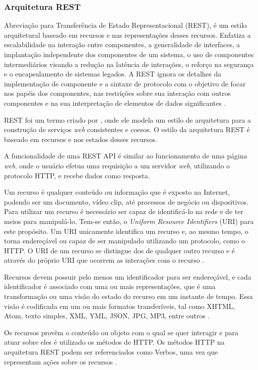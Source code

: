 \subsubsection{Arquitetura REST}
Abreviação para Transferência de Estado Representacional (REST), é um estilo arquitetural baseado em recursos e nas representações desses recursos. Enfatiza a escalabilidade na interação entre componentes, a generalidade de interfaces, a implantação independente dos componentes de um sistema, o uso de componentes intermediários visando a redução na latência de interações, o reforço na segurança e o encapsulamento de sistemas legados. A REST ignora os detalhes da implementação de componente e a sintaxe de protocolo com o objetivo de focar nos papéis dos componentes, nas restrições sobre sua interação com outros componentes e na sua interpretação de elementos de dados significantes \cite{rest}.

REST foi um termo criado por , onde ele modela um estilo de arquitetura para a construção de serviços \textit{web} consistentes e coesos. O estilo da arquitetura REST é baseado em recursos e nos estados desses recursos.

A funcionalidade de uma REST API é similar ao funcionamento de uma página \textit{web}, onde o usuário efetua uma requisição a um servidor \textit{web}, utilizando o protocolo HTTP, e recebe dados como resposta.

Um recurso é qualquer conteúdo ou informação que é exposto na Internet, podendo ser um documento, vídeo clip, até processos de negócio ou dispositivos. Para utilizar um recurso é necessário ser capaz de identificá-lo na rede e de ter meios para manipulá-lo. Tem-se então, o \textit{Uniform Resource Identifiers} (URI) para este propósito. Um URI unicamente identifica um recurso e, ao mesmo tempo, o torna endereçável ou capaz de ser manipulado utilizando um protocolo, como o HTTP. O URI de um recurso se distingue dos de qualquer outro recurso e é através do próprio URI que ocorrem as interações com o recurso \cite{rest-book}.

Recursos devem possuir pelo menos um identificador para ser endereçável, e cada identificador é associado com uma ou mais representações, que é uma transformação ou uma visão do estado do recurso em um instante de tempo. Essa visão é codificada em um ou mais formatos transferíveis, tal como XHTML, Atom, texto simples, XML, YML, JSON, JPG, MP3, entre outros  \cite{rest-book}.

Os recursos provêm o conteúdo ou objeto com o qual se quer interagir e para atuar sobre eles é utilizado os métodos de HTTP. Os métodos HTTP na arquitetura REST podem ser referenciados como Verbos, uma vez que representam ações sobre os recursos \cite{rest-book}.


